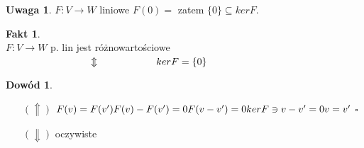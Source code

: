 \documentclass[12pt,a4paper]{article}
\renewcommand{\qed}{$\square$}
\theoremstyle{plain}
\theoremstyle{definition}
\newtheorem{ft}{Fakt}[section]
\theoremstyle{definition}
\theoremstyle{definition}
\theoremstyle{definition}
\newtheorem*{dd}{Dowód}
\theoremstyle{definition}
\theoremstyle{definition}
\theoremstyle{definition}
\theoremstyle{definition}
\newtheorem*{uw}{Uwaga}
\theoremstyle{definition}
\begin{document}
\begin{uw}
    $F: V \rightarrow W $ liniowe
    $F(0) = $ %
    zatem $\{0\} \subseteq ker F$.
\end{uw}

\begin{ft} 
    ~\\
    $F: V \rightarrow W $ p. lin jest różnowartościowe \\
    $ \hspace*{30mm} \Updownarrow \\
        \hspace*{20mm} ker F = \{ 0 \}
    $
\end{ft}

\begin{dd} \hfill
    \begin{itemize}
        \item[$(\Uparrow)$] $F(v) = F(v') \\ 
            F(v)-F(v') = 0 \\
            F(v-v') = 0 \\
            ker F \ni v-v' = 0 \\
            v = v' 
        $ \qed
        \item[$(\Downarrow)$] oczywiste
    \end{itemize}
\end{dd}
\end{document}
